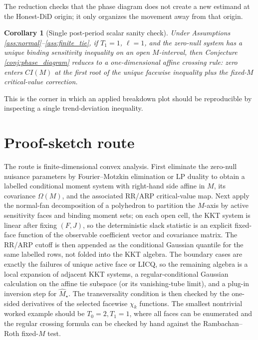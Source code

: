 \documentclass[11pt]{article}
\theoremstyle{definition}
\theoremstyle{plain}
\newtheorem{corollary}{Corollary}
\theoremstyle{remark}
\begin{document}
The reduction checks that the phase diagram does not create a new estimand at
the Honest-DiD origin; it only organizes the movement away from that origin.

\begin{corollary}[Single post-period scalar sanity check]\label{cor:scalar}
Under Assumptions \ref{ass:normal}--\ref{ass:finite_tie}, if \(T_1=1\),
\(\ell=1\), and the zero-null system has a unique binding sensitivity
inequality on an open \(M\)-interval, then Conjecture
\ref{conj:phase_diagram} reduces to a one-dimensional affine crossing rule:
zero enters \(CI(M)\) at the first root of the unique facewise inequality plus
the fixed-\(M\) critical-value correction.
\end{corollary}

This is the corner in which an applied breakdown plot should be reproducible
by inspecting a single trend-deviation inequality.

\section{Proof-sketch route}
The route is finite-dimensional convex analysis.  First eliminate the
zero-null nuisance parameters by Fourier--Motzkin elimination or LP duality to
obtain a labelled conditional moment system with right-hand side affine in
\(M\), its covariance \(\Omega(M)\), and the associated RR/ARP critical-value
map.  Next apply the normal-fan decomposition of a polyhedron to partition
the \(M\)-axis by active sensitivity faces and binding moment sets; on each
open cell, the KKT system is linear after fixing \((F,J)\), so the
deterministic slack statistic is an explicit fixed-face function of the
observable coefficient vector and covariance matrix.  The RR/ARP cutoff is
then appended as the conditional Gaussian quantile for the same labelled rows,
not folded into the KKT algebra.  The boundary cases are exactly the failures
of unique active face or LICQ, so the remaining algebra is a local expansion
of adjacent KKT systems, a regular-conditional Gaussian calculation on the
affine tie subspace (or its vanishing-tube limit), and a plug-in inversion
step for \(\widehat M_\star\).  The transversality condition is then checked
by the one-sided derivatives of the selected facewise \(\chi_k\) functions.
The smallest nontrivial worked example should be \(T_0=2,T_1=1\), where all
faces can be enumerated and the regular crossing formula can be checked by
hand against the Rambachan--Roth fixed-\(M\) test.
\end{document}
